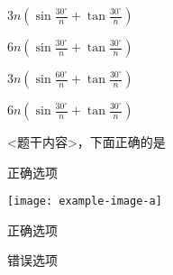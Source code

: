 \documentclass{ctexart}
\begin{document}
    \begin{xchoices}[showanswer]
      \item
      $3 n(\sin \frac{30^{\circ}}{n}+\tan \frac{30^{\circ}}{n})$
      \item*
      $6 n(\sin \frac{30^{\circ}}{n}+\tan \frac{30^{\circ}}{n})$
      \item*
      $3 n(\sin \frac{60^{\circ}}{n}+\tan \frac{30^{\circ}}{n})$
      \item
      $6 n(\sin \frac{30^{\circ}}{n}+\tan \frac{30^{\circ}}{n})$ 
    \end{xchoices}

    <题干内容>，下面正确的是\paren
    \begin{xchoices}[
      label-style = quan
    ]
      \item* 正确选项
      \item  \texttt{[image: example-image-a]}
      \item* 正确选项
      \item  错误选项
    \end{xchoices}
\end{document}
